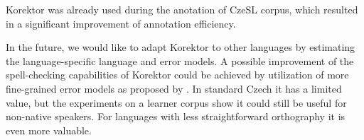 \documentclass[11pt]{article}
\begin{document}
Korektor was already used during the anotation of CzeSL corpus, which
resulted in a significant improvement of annotation efficiency.

In the future, we would like to adapt Korektor to other languages by
estimating the language-specific language and error models.  A
possible improvement of the spell-checking capabilities of Korektor
could be achieved by utilization of more fine-grained error models as
proposed by .  In standard Czech it has a limited value, 
but the experiments on a learner corpus show it could still be useful for non-native speakers.
For languages with less straightforward orthography it is even more valuable.


\newpage
\end{document}
